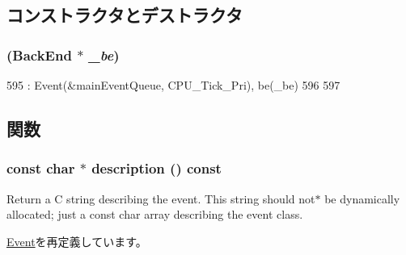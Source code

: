 \subsection{コンストラクタとデストラクタ}
\hypertarget{classBackEnd_1_1DCacheCompletionEvent_a3448601dc7561a31778d913584e4fbae}{
\subsubsection[{DCacheCompletionEvent}]{ ({\bf BackEnd} $\ast$ {\em \_\-be})}}
\label{classBackEnd_1_1DCacheCompletionEvent_a3448601dc7561a31778d913584e4fbae}



\begin{DoxyCode}
595     : Event(&mainEventQueue, CPU_Tick_Pri), be(_be)
596 {
597 }
\end{DoxyCode}


\subsection{関数}
\hypertarget{classBackEnd_1_1DCacheCompletionEvent_a5a14fe478e2393ff51f02e9b7be27e00}{
\subsubsection[{description}]{\setlength{\rightskip}{0pt plus 5cm}const char $\ast$ description () const}}
\label{classBackEnd_1_1DCacheCompletionEvent_a5a14fe478e2393ff51f02e9b7be27e00}
Return a C string describing the event. This string should not$\ast$ be dynamically allocated; just a const char array describing the event class. 

\hyperlink{classEvent_a130ddddf003422b413e2e891b1b80e8f}{Event}を再定義しています。


